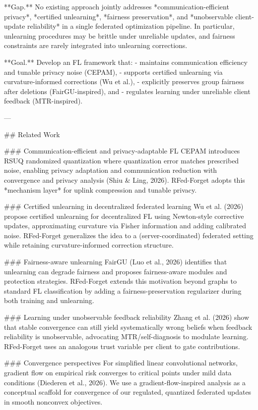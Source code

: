 **Gap.** No existing approach jointly addresses *communication-efficient privacy*, *certified unlearning*, *fairness preservation*, and *unobservable client-update reliability* in a single federated optimization pipeline. In particular, unlearning procedures may be brittle under unreliable updates, and fairness constraints are rarely integrated into unlearning corrections.

**Goal.** Develop an FL framework that:  
- maintains communication efficiency and tunable privacy noise (CEPAM),  
- supports certified unlearning via curvature-informed corrections (Wu et al.),  
- explicitly preserves group fairness after deletions (FairGU-inspired), and  
- regulates learning under unreliable client feedback (MTR-inspired).

---

## Related Work  

### Communication-efficient and privacy-adaptable FL  
CEPAM introduces RSUQ randomized quantization where quantization error matches prescribed noise, enabling privacy adaptation and communication reduction with convergence and privacy analysis (Shiu & Ling, 2026). RFed-Forget adopts this *mechanism layer* for uplink compression and tunable privacy.

### Certified unlearning in decentralized federated learning  
Wu et al. (2026) propose certified unlearning for decentralized FL using Newton-style corrective updates, approximating curvature via Fisher information and adding calibrated noise. RFed-Forget generalizes the idea to a (server-coordinated) federated setting while retaining curvature-informed correction structure.

### Fairness-aware unlearning  
FairGU (Luo et al., 2026) identifies that unlearning can degrade fairness and proposes fairness-aware modules and protection strategies. RFed-Forget extends this motivation beyond graphs to standard FL classification by adding a fairness-preservation regularizer during both training and unlearning.

### Learning under unobservable feedback reliability  
Zhang et al. (2026) show that stable convergence can still yield systematically wrong beliefs when feedback reliability is unobservable, advocating MTR/self-diagnosis to modulate learning. RFed-Forget uses an analogous trust variable per client to gate contributions.

### Convergence perspectives  
For simplified linear convolutional networks, gradient flow on empirical risk converges to critical points under mild data conditions (Diederen et al., 2026). We use a gradient-flow-inspired analysis as a conceptual scaffold for convergence of our regulated, quantized federated updates in smooth nonconvex objectives.

